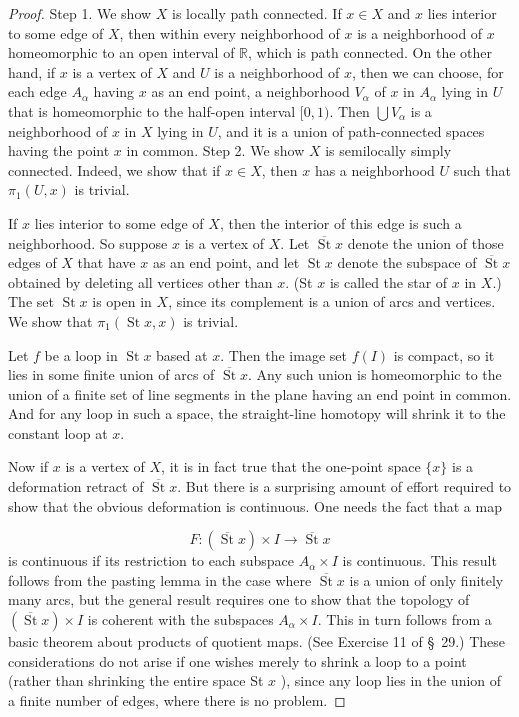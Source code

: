 \begin{proof}
	Step 1. We show \(X\) is locally path connected. If \(x \in X\) and \(x\) lies interior to some edge of \(X\), then within every neighborhood of \(x\) is a neighborhood of \(x\) homeomorphic to an open interval of \(\mathbb{R}\), which is path connected. On the other hand, if \(x\) is a vertex of \(X\) and \(U\) is a neighborhood of \(x\), then we can choose, for each edge \(A_{\alpha }\) having \(x\) as an end point, a neighborhood \(V_{\alpha }\) of \(x\) in \(A_{\alpha }\) lying in \(U\) that is homeomorphic to the half-open interval \([ {0,1})\). Then \(\bigcup {V}_{\alpha }\) is a neighborhood of \(x\) in \(X\) lying in \(U\), and it is a union of path-connected spaces having the point \(x\) in common.
Step 2. We show \(X\) is semilocally simply connected. Indeed, we show that if \(x \in X\), then \(x\) has a neighborhood \(U\) such that \({\pi }_{1}( {U,x})\) is trivial.

If \(x\) lies interior to some edge of \(X\), then the interior of this edge is such a neighborhood. So suppose \(x\) is a vertex of \(X\). Let \(\overline{\operatorname{St}}x\) denote the union of those edges of \(X\) that have \(x\) as an end point, and let \(\operatorname{St}x\) denote the subspace of \(\overline{\operatorname{St}}x\) obtained by deleting all vertices other than \(x\). (St \(x\) is called the star of \(x\) in \(X\).) The set \(\operatorname{St}x\) is open in \(X\), since its complement is a union of arcs and vertices. We show that \({\pi }_{1}( {\operatorname{St}x, x})\) is trivial.

Let \(f\) be a loop in \(\operatorname{St}x\) based at \(x\). Then the image set \(f( I)\) is compact, so it lies in some finite union of arcs of \(\overline{\operatorname{St}}x\). Any such union is homeomorphic to the union of a finite set of line segments in the plane having an end point in common. And for any loop in such a space, the straight-line homotopy will shrink it to the constant loop at \(x\).

Now if \(x\) is a vertex of \(X\), it is in fact true that the one-point space \(\{ x\}\) is a deformation retract of \(\overline{\operatorname{St}}x\). But there is a surprising amount of effort required to show that the obvious deformation is continuous. One needs the fact that a map

\[
F : ( {\overline{\operatorname{St}}x}) \times I \rightarrow \overline{\operatorname{St}}x
\]
is continuous if its restriction to each subspace \(A_{\alpha } \times I\) is continuous. This result follows from the pasting lemma in the case where \(\overline{\operatorname{St}}x\) is a union of only finitely many arcs, but the general result requires one to show that the topology of \(( {\overline{\operatorname{St}}x}) \times I\) is coherent with the subspaces \(A_{\alpha } \times I\). This in turn follows from a basic theorem about products of quotient maps. (See Exercise 11 of \S\ 29.) These considerations do not arise if one wishes merely to shrink a loop to a point (rather than shrinking the entire space St \(x\) ), since any loop lies in the union of a finite number of edges, where there is no problem.
\end{proof}

